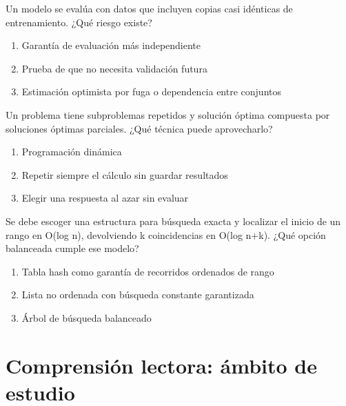 \noindent\begin{minipage}{\linewidth}\setlength{\parskip}{4pt}\label{q:S-098}
Un modelo se evalúa con datos que incluyen copias casi idénticas de entrenamiento. ¿Qué riesgo existe?
\begin{enumerate}[label=\Alph*),nosep]
\item Garantía de evaluación más independiente
\item Prueba de que no necesita validación futura
\item Estimación optimista por fuga o dependencia entre conjuntos
\end{enumerate}\end{minipage}\par\medskip

\noindent\begin{minipage}{\linewidth}\setlength{\parskip}{4pt}\label{q:S-099}
Un problema tiene subproblemas repetidos y solución óptima compuesta por soluciones óptimas parciales. ¿Qué técnica puede aprovecharlo?
\begin{enumerate}[label=\Alph*),nosep]
\item Programación dinámica
\item Repetir siempre el cálculo sin guardar resultados
\item Elegir una respuesta al azar sin evaluar
\end{enumerate}\end{minipage}\par\medskip

\noindent\begin{minipage}{\linewidth}\setlength{\parskip}{4pt}\label{q:S-100}
Se debe escoger una estructura para búsqueda exacta y localizar el inicio de un rango en O(log n), devolviendo k coincidencias en O(log n+k). ¿Qué opción balanceada cumple ese modelo?
\begin{enumerate}[label=\Alph*),nosep]
\item Tabla hash como garantía de recorridos ordenados de rango
\item Lista no ordenada con búsqueda constante garantizada
\item Árbol de búsqueda balanceado
\end{enumerate}\end{minipage}\par\medskip

\section{Comprensión lectora: ámbito de estudio}

